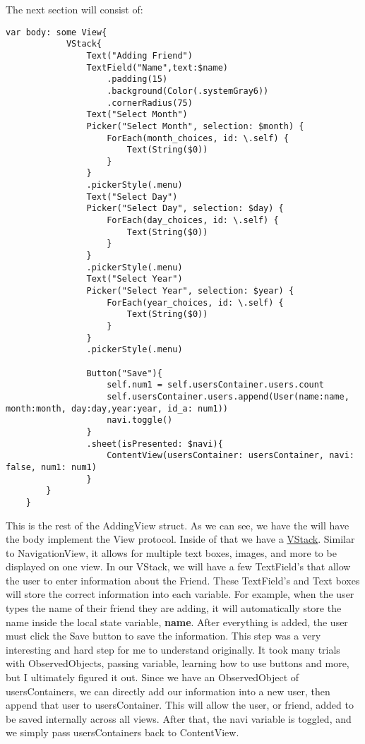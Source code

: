 \documentclass{article}
\theoremstyle{theorem}
\theoremstyle{definition}
\theoremstyle{remark}
\begin{document}
\noindent\newline The next section will consist of:
\begin{verbatim}
var body: some View{
            VStack{
                Text("Adding Friend")
                TextField("Name",text:$name)
                    .padding(15)
                    .background(Color(.systemGray6))
                    .cornerRadius(75)
                Text("Select Month")
                Picker("Select Month", selection: $month) {
                    ForEach(month_choices, id: \.self) {
                        Text(String($0))
                    }
                }
                .pickerStyle(.menu)
                Text("Select Day")
                Picker("Select Day", selection: $day) {
                    ForEach(day_choices, id: \.self) {
                        Text(String($0))
                    }
                }
                .pickerStyle(.menu)
                Text("Select Year")
                Picker("Select Year", selection: $year) {
                    ForEach(year_choices, id: \.self) {
                        Text(String($0))
                    }
                }
                .pickerStyle(.menu)
                
                Button("Save"){
                    self.num1 = self.usersContainer.users.count
                    self.usersContainer.users.append(User(name:name, month:month, day:day,year:year, id_a: num1))
                    navi.toggle()
                }
                .sheet(isPresented: $navi){
                    ContentView(usersContainer: usersContainer, navi: false, num1: num1)
                }
        }
    }
\end{verbatim}
\noindent\newline This is the rest of the AddingView struct. As we can see, we have the will have the body implement the View protocol. Inside of that we have a \href{https://developer.apple.com/documentation/swiftui/vstack}{VStack}. Similar to NavigationView, it allows for multiple text boxes, images, and more to be displayed on one view. In our VStack, we will have a few TextField's that allow the user to enter information about the Friend. These TextField's and Text boxes will store the correct information into each variable. For example, when the user types the name of their friend they are adding, it will automatically store the name inside the local state variable, \textbf{name}. After everything is added, the user must click the Save button to save the information. This step was a very interesting and hard step for me to understand originally. It took many trials with ObservedObjects, passing variable, learning how to use buttons and more, but I ultimately figured it out. Since we have an ObservedObject of usersContainers, we can directly add our information into a new user, then append that user to usersContainer. This will allow the user, or friend, added to be saved internally across all views. After that, the navi variable is toggled, and we simply pass usersContainers back to ContentView.
\end{document}
